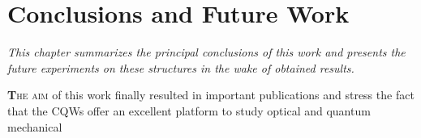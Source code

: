 \chapter{Conclusions and Future Work }
\label{chap:Intro}
\textit{This chapter summarizes the principal conclusions of this work and presents the future experiments on these structures in the wake of obtained results.}
\vfill
\minitoc
\newpage
\allowdisplaybreaks


\lettrine[lines=3, lraise=.1, nindent=0mm, slope=0mm]{\textbf{T}}{he aim} of this work finally resulted in important publications and stress the fact that the \gls{CQWs} offer an excellent platform to study optical and quantum mechanical
